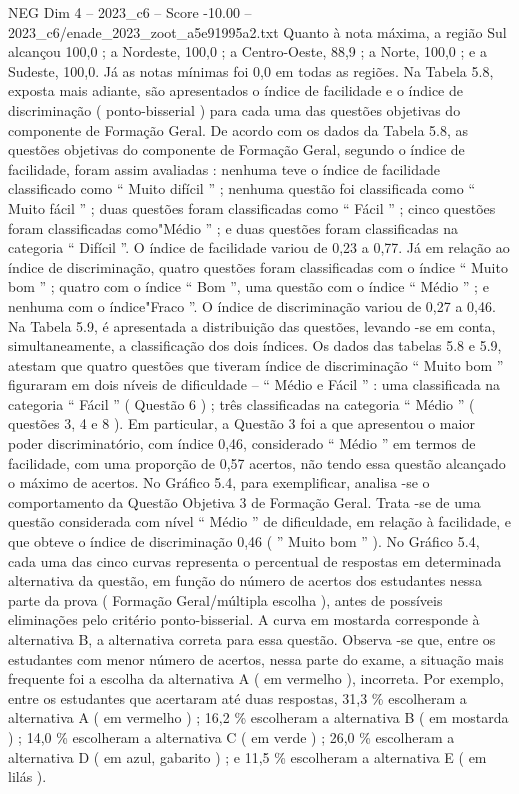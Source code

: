 \begin{textsample}{NEG Dim 4 – 2023\_c6 – Score -10.00 – 2023\_c6/enade\_2023\_zoot\_a5e91995a2.txt}
Quanto à nota máxima, a região Sul alcançou 100,0 ; a Nordeste, 100,0 ; a Centro-Oeste, 88,9 ; a Norte, 100,0 ; e a Sudeste, 100,0.
Já as notas mínimas foi 0,0 em todas as regiões.
Na Tabela 5.8, exposta mais adiante, são apresentados o índice de facilidade e o índice de discriminação ( ponto-bisserial ) para cada uma das questões objetivas do componente de Formação Geral.
De acordo com os dados da Tabela 5.8, as questões objetivas do componente de Formação Geral, segundo o índice de facilidade, foram assim avaliadas : nenhuma teve o índice de facilidade classificado como “ Muito difícil ” ; nenhuma questão foi classificada como “ Muito fácil ” ; duas questões foram classificadas como “ Fácil ” ; cinco questões foram classificadas como"Médio ” ; e duas questões foram classificadas na categoria “ Difícil ”.
O índice de facilidade variou de 0,23 a 0,77.
Já em relação ao índice de discriminação, quatro questões foram classificadas com o índice “ Muito bom ” ; quatro com o índice “ Bom ”, uma questão com o índice “ Médio ” ; e nenhuma com o índice"Fraco ”.
O índice de discriminação variou de 0,27 a 0,46.
Na Tabela 5.9, é apresentada a distribuição das questões, levando -se em conta, simultaneamente, a classificação dos dois índices.
Os dados das tabelas 5.8 e 5.9, atestam que quatro questões que tiveram índice de discriminação “ Muito bom ” figuraram em dois níveis de dificuldade – “ Médio e Fácil ” : uma classificada na categoria “ Fácil ” ( Questão 6 ) ; três classificadas na categoria “ Médio ” ( questões 3, 4 e 8 ).
Em particular, a Questão 3 foi a que apresentou o maior poder discriminatório, com índice 0,46, considerado “ Médio ” em termos de facilidade, com uma proporção de 0,57 acertos, não tendo essa questão alcançado o máximo de acertos.
No Gráfico 5.4, para exemplificar, analisa -se o comportamento da Questão Objetiva 3 de Formação Geral.
Trata -se de uma questão considerada com nível “ Médio ” de dificuldade, em relação à facilidade, e que obteve o índice de discriminação 0,46 ( ” Muito bom ” ).
No Gráfico 5.4, cada uma das cinco curvas representa o percentual de respostas em determinada alternativa da questão, em função do número de acertos dos estudantes nessa parte da prova ( Formação Geral/múltipla escolha ), antes de possíveis eliminações pelo critério ponto-bisserial.
A curva em mostarda corresponde à alternativa B, a alternativa correta para essa questão.
Observa -se que, entre os estudantes com menor número de acertos, nessa parte do exame, a situação mais frequente foi a escolha da alternativa A ( em vermelho ), incorreta.
Por exemplo, entre os estudantes que acertaram até duas respostas, 31,3 \% escolheram a alternativa A ( em vermelho ) ; 16,2 \% escolheram a alternativa B ( em mostarda ) ; 14,0 \% escolheram a alternativa C ( em verde ) ; 26,0 \% escolheram a alternativa D ( em azul, gabarito ) ; e 11,5 \% escolheram a alternativa E ( em lilás ).

\end{textsample}

